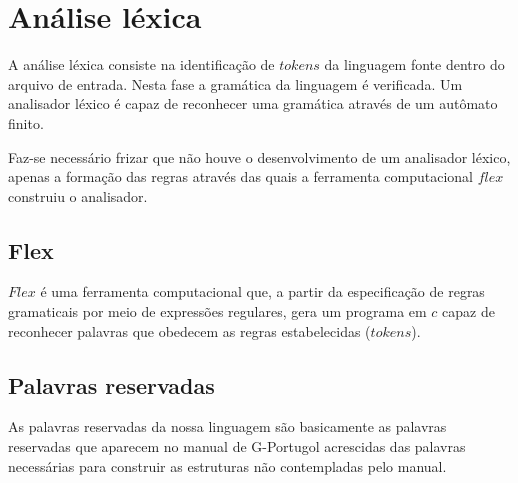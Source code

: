 \documentclass[a4paper,12pt]{report}
\begin{document}
\section{An\'alise l\'exica}

A an\'alise l\'exica consiste na identifica\c{c}\~ao de $tokens$ da linguagem fonte dentro do arquivo de entrada. 
Nesta fase a gram\'atica da linguagem \'e verificada. Um analisador l\'exico \'e capaz de reconhecer uma gram\'atica 
atrav\'es de um aut\^omato finito.

Faz-se necess\'ario frizar que n\~ao houve o desenvolvimento de um analisador l\'exico, apenas a forma\c{c}\~ao das regras 
atrav\'es das quais a ferramenta computacional $flex$ construiu o analisador.

\subsection{Flex}

$Flex$ \'e uma ferramenta computacional que, a partir da especifica\c{c}\~ao de regras gramaticais por meio de express\~oes
regulares, gera um programa em $c$ capaz de reconhecer palavras que obedecem as regras estabelecidas ($tokens$).

\subsection{Palavras reservadas}

As palavras reservadas da nossa linguagem s\~ao basicamente as palavras reservadas que aparecem no manual de G-Portugol 
acrescidas das palavras necess\'arias para construir as estruturas n\~ao contempladas pelo manual.
\end{document}
